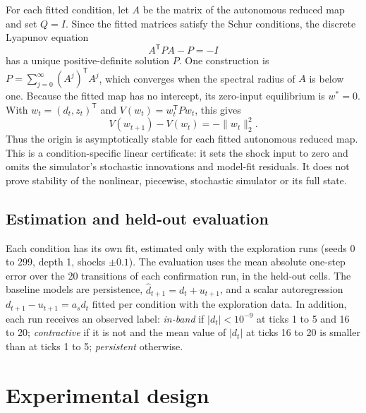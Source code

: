 For each fitted condition, let $A$ be the matrix of the autonomous reduced map and set $Q=I$. Since the fitted matrices satisfy the Schur conditions, the discrete Lyapunov equation
\begin{equation}
  A^{\mathsf T}PA-P=-I
  \label{eq:lyap-reduced}
\end{equation}
has a unique positive-definite solution $P$. One construction is $P=\sum_{j=0}^{\infty}(A^j)^{\mathsf T}A^j$, which converges when the spectral radius of $A$ is below one. Because the fitted map has no intercept, its zero-input equilibrium is $w^*=0$. With $w_t=(d_t,z_t)^{\mathsf T}$ and $V(w_t)=w_t^{\mathsf T}Pw_t$, this gives
\begin{equation}
  V(w_{t+1})-V(w_t)=-\lVert w_t\rVert_2^2.
  \label{eq:lyap-decrease}
\end{equation}
Thus the origin is asymptotically stable for each fitted autonomous reduced map. This is a condition-specific linear certificate: it sets the shock input to zero and omits the simulator's stochastic innovations and model-fit residuals. It does not prove stability of the nonlinear, piecewise, stochastic simulator or its full state.

\subsection{Estimation and held-out evaluation}

Each condition has its own fit, estimated only with the exploration runs (seeds 0 to 299, depth 1, shocks $\pm0.1$). The evaluation uses the mean absolute one-step error over the 20 transitions of each confirmation run, in the held-out cells. The baseline models are persistence, $\hat d_{t+1}=d_t+u_{t+1}$, and a scalar autoregression $d_{t+1}-u_{t+1}=a_s d_t$ fitted per condition with the exploration data. In addition, each run receives an observed label: \emph{in-band} if $|d_t|<10^{-9}$ at ticks 1 to 5 and 16 to 20; \emph{contractive} if it is not and the mean value of $|d_t|$ at ticks 16 to 20 is smaller than at ticks 1 to 5; \emph{persistent} otherwise.

\section{Experimental design}

